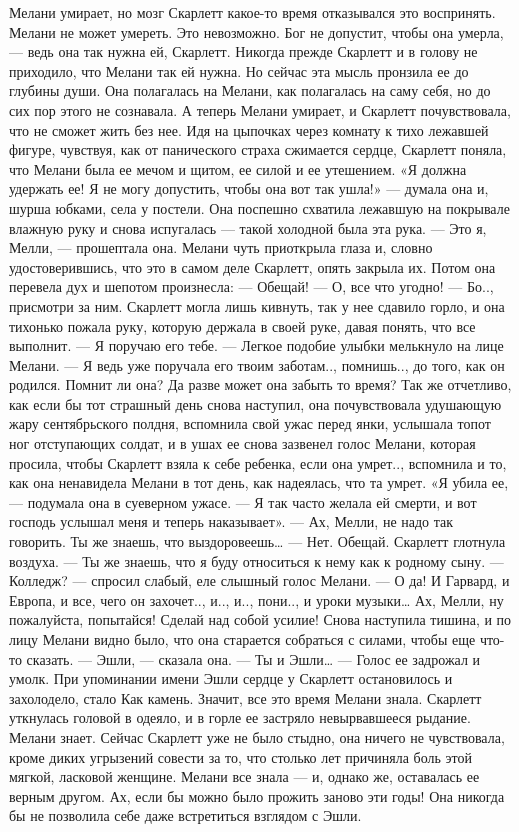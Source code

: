 Мелани умирает, но мозг Скарлетт какое-то время отказывался это воспринять. Мелани не может умереть. Это невозможно. Бог не допустит, чтобы она умерла, — ведь она так нужна ей, Скарлетт. Никогда прежде Скарлетт и в голову не приходило, что Мелани так ей нужна. Но сейчас эта мысль пронзила ее до глубины души. Она полагалась на Мелани, как полагалась на саму себя, но до сих пор этого не сознавала. А теперь Мелани умирает, и Скарлетт почувствовала, что не сможет жить без нее. Идя на цыпочках через комнату к тихо лежавшей фигуре, чувствуя, как от панического страха сжимается сердце, Скарлетт поняла, что Мелани была ее мечом и щитом, ее силой и ее утешением.
«Я должна удержать ее! Я не могу допустить, чтобы она вот так ушла!» — думала она и, шурша юбками, села у постели. Она поспешно схватила лежавшую на покрывале влажную руку и снова испугалась — такой холодной была эта рука.
— Это я, Мелли, — прошептала она.
Мелани чуть приоткрыла глаза и, словно удостоверившись, что это в самом деле Скарлетт, опять закрыла их. Потом она перевела дух и шепотом произнесла:
— Обещай!
— О, все что угодно!
— Бо.., присмотри за ним.
Скарлетт могла лишь кивнуть, так у нее сдавило горло, и она тихонько пожала руку, которую держала в своей руке, давая понять, что все выполнит.
— Я поручаю его тебе. — Легкое подобие улыбки мелькнуло на лице Мелани. — Я ведь уже поручала его твоим заботам.., помнишь.., до того, как он родился.
Помнит ли она? Да разве может она забыть то время? Так же отчетливо, как если бы тот страшный день снова наступил, она почувствовала удушающую жару сентябрьского полдня, вспомнила свой ужас перед янки, услышала топот ног отступающих солдат, и в ушах ее снова зазвенел голос Мелани, которая просила, чтобы Скарлетт взяла к себе ребенка, если она умрет.., вспомнила и то, как она ненавидела Мелани в тот день, как надеялась, что та умрет.
«Я убила ее, — подумала она в суеверном ужасе. — Я так часто желала ей смерти, и вот господь услышал меня и теперь наказывает».
— Ах, Мелли, не надо так говорить. Ты же знаешь, что выздоровеешь…
— Нет. Обещай.
Скарлетт глотнула воздуха.
— Ты же знаешь, что я буду относиться к нему как к родному сыну.
— Колледж? — спросил слабый, еле слышный голос Мелани.
— О да! И Гарвард, и Европа, и все, чего он захочет.., и.., и.., пони.., и уроки музыки… Ах, Мелли, ну пожалуйста, попытайся! Сделай над собой усилие!
Снова наступила тишина, и по лицу Мелани видно было, что она старается собраться с силами, чтобы еще что-то сказать.
— Эшли, — сказала она. — Ты и Эшли… — Голос ее задрожал и умолк.
При упоминании имени Эшли сердце у Скарлетт остановилось и захолодело, стало Как камень. Значит, все это время Мелани знала. Скарлетт уткнулась головой в одеяло, и в горле ее застряло невырвавшееся рыдание. Мелани знает. Сейчас Скарлетт уже не было стыдно, она ничего не чувствовала, кроме диких угрызений совести за то, что столько лет причиняла боль этой мягкой, ласковой женщине. Мелани все знала — и, однако же, оставалась ее верным другом. Ах, если бы можно было прожить заново эти годы! Она никогда бы не позволила себе даже встретиться взглядом с Эшли.
